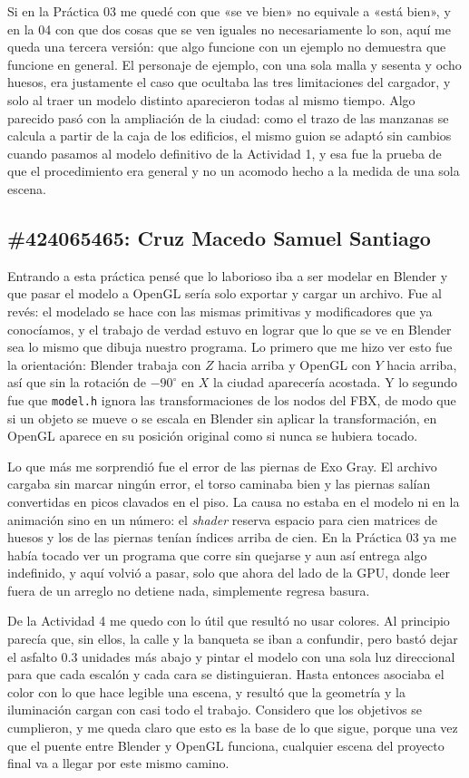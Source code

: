 Si en la Práctica 03 me quedé con que «se ve bien» no equivale a «está bien», y en la 04 con que dos cosas que se ven iguales no necesariamente lo son, aquí me queda una tercera versión: que algo funcione con un ejemplo no demuestra que funcione en general. El personaje de ejemplo, con una sola malla y sesenta y ocho huesos, era justamente el caso que ocultaba las tres limitaciones del cargador, y solo al traer un modelo distinto aparecieron todas al mismo tiempo. Algo parecido pasó con la ampliación de la ciudad: como el trazo de las manzanas se calcula a partir de la caja de los edificios, el mismo guion se adaptó sin cambios cuando pasamos al modelo definitivo de la Actividad 1, y esa fue la prueba de que el procedimiento era general y no un acomodo hecho a la medida de una sola escena.

\subsection*{\#424065465: Cruz Macedo Samuel Santiago}
Entrando a esta práctica pensé que lo laborioso iba a ser modelar en Blender y que pasar el modelo a OpenGL sería solo exportar y cargar un archivo. Fue al revés: el modelado se hace con las mismas primitivas y modificadores que ya conocíamos, y el trabajo de verdad estuvo en lograr que lo que se ve en Blender sea lo mismo que dibuja nuestro programa. Lo primero que me hizo ver esto fue la orientación: Blender trabaja con $Z$ hacia arriba y OpenGL con $Y$ hacia arriba, así que sin la rotación de $-90^\circ$ en $X$ la ciudad aparecería acostada. Y lo segundo fue que \texttt{model.h} ignora las transformaciones de los nodos del FBX, de modo que si un objeto se mueve o se escala en Blender sin aplicar la transformación, en OpenGL aparece en su posición original como si nunca se hubiera tocado.

Lo que más me sorprendió fue el error de las piernas de Exo Gray. El archivo cargaba sin marcar ningún error, el torso caminaba bien y las piernas salían convertidas en picos clavados en el piso. La causa no estaba en el modelo ni en la animación sino en un número: el \textit{shader} reserva espacio para cien matrices de huesos y los de las piernas tenían índices arriba de cien. En la Práctica 03 ya me había tocado ver un programa que corre sin quejarse y aun así entrega algo indefinido, y aquí volvió a pasar, solo que ahora del lado de la GPU, donde leer fuera de un arreglo no detiene nada, simplemente regresa basura.

De la Actividad 4 me quedo con lo útil que resultó no usar colores. Al principio parecía que, sin ellos, la calle y la banqueta se iban a confundir, pero bastó dejar el asfalto 0.3 unidades más abajo y pintar el modelo con una sola luz direccional para que cada escalón y cada cara se distinguieran. Hasta entonces asociaba el color con lo que hace legible una escena, y resultó que la geometría y la iluminación cargan con casi todo el trabajo. Considero que los objetivos se cumplieron, y me queda claro que esto es la base de lo que sigue, porque una vez que el puente entre Blender y OpenGL funciona, cualquier escena del proyecto final va a llegar por este mismo camino.

